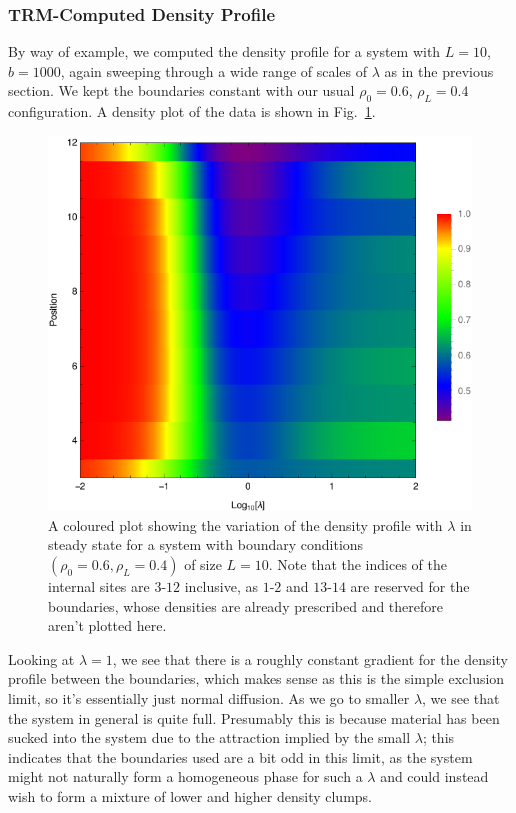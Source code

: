 \subsubsection{TRM-Computed Density Profile}
By way of example, we computed the density profile for a system with $L=10$, $b=1000$,
again sweeping through a wide range of scales of $\lambda$ as in the previous section.
We kept the boundaries constant with our usual $\rho_0 = 0.6$, $\rho_L = 0.4$
configuration. A density plot of the data is shown in Fig.~\ref{fig:analDensProf}.
 \begin{figure}[h!]
 \caption[The variation of the density profile with $\lambda$ for a system of size
 $L=12$ and boundaries $(\rho_0 = 0.6, \rho_L = 0.4)$.]{\label{fig:analDensProf} 
A coloured plot showing the variation of the density profile with $\lambda$ in steady state for a 
system with boundary conditions $(\rho_0 = 0.6, \rho_L = 0.4)$ of size $L=10$. Note 
that the indices of the internal sites are $3$-$12$ inclusive, as $1$-$2$ and 
$13$-$14$ are reserved for the boundaries, whose densities are already prescribed and therefore aren't plotted here.
 }
  
  \begin{center}
 \includegraphics[width=1.0\textwidth]{TRM/images/analMidDensProfile}
  \end{center}
\end{figure}
 Looking at $\lambda=1$, we see that there is a roughly constant gradient for the density profile between the
 boundaries, which makes sense as this is the simple exclusion limit, so it's essentially just normal
 diffusion.
 As we go to smaller $\lambda$, we see that the system in general is quite full. Presumably this is because
 material has been sucked into the system due to the attraction implied by the small $\lambda$; this
 indicates that the boundaries used are a bit odd in this limit, as the system might not naturally form
 a homogeneous phase for such a $\lambda$ and could instead wish to form a mixture of lower and 
 higher density clumps. 
 
